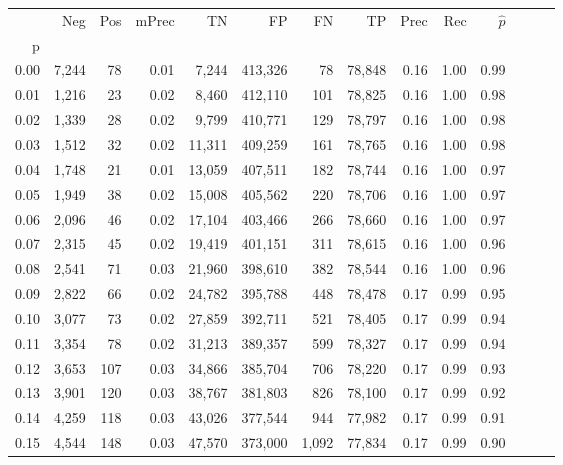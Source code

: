 \begin{tabular}{rrrrrrrrrrrrrr}
\toprule
{} &    Neg &    Pos & mPrec &       TN &       FP &      FN &      TP &  Prec &   Rec & $\hat{p}$ \\
p    &        &        &       &          &          &         &         &       &       &           \\
\midrule
0.00 &  7,244 &     78 &  0.01 &    7,244 &  413,326 &      78 &  78,848 &  0.16 &  1.00 &      0.99 \\
0.01 &  1,216 &     23 &  0.02 &    8,460 &  412,110 &     101 &  78,825 &  0.16 &  1.00 &      0.98 \\
0.02 &  1,339 &     28 &  0.02 &    9,799 &  410,771 &     129 &  78,797 &  0.16 &  1.00 &      0.98 \\
0.03 &  1,512 &     32 &  0.02 &   11,311 &  409,259 &     161 &  78,765 &  0.16 &  1.00 &      0.98 \\
0.04 &  1,748 &     21 &  0.01 &   13,059 &  407,511 &     182 &  78,744 &  0.16 &  1.00 &      0.97 \\
0.05 &  1,949 &     38 &  0.02 &   15,008 &  405,562 &     220 &  78,706 &  0.16 &  1.00 &      0.97 \\
0.06 &  2,096 &     46 &  0.02 &   17,104 &  403,466 &     266 &  78,660 &  0.16 &  1.00 &      0.97 \\
0.07 &  2,315 &     45 &  0.02 &   19,419 &  401,151 &     311 &  78,615 &  0.16 &  1.00 &      0.96 \\
0.08 &  2,541 &     71 &  0.03 &   21,960 &  398,610 &     382 &  78,544 &  0.16 &  1.00 &      0.96 \\
0.09 &  2,822 &     66 &  0.02 &   24,782 &  395,788 &     448 &  78,478 &  0.17 &  0.99 &      0.95 \\
0.10 &  3,077 &     73 &  0.02 &   27,859 &  392,711 &     521 &  78,405 &  0.17 &  0.99 &      0.94 \\
0.11 &  3,354 &     78 &  0.02 &   31,213 &  389,357 &     599 &  78,327 &  0.17 &  0.99 &      0.94 \\
0.12 &  3,653 &    107 &  0.03 &   34,866 &  385,704 &     706 &  78,220 &  0.17 &  0.99 &      0.93 \\
0.13 &  3,901 &    120 &  0.03 &   38,767 &  381,803 &     826 &  78,100 &  0.17 &  0.99 &      0.92 \\
0.14 &  4,259 &    118 &  0.03 &   43,026 &  377,544 &     944 &  77,982 &  0.17 &  0.99 &      0.91 \\
0.15 &  4,544 &    148 &  0.03 &   47,570 &  373,000 &   1,092 &  77,834 &  0.17 &  0.99 &      0.90 \\

\end{tabular}
